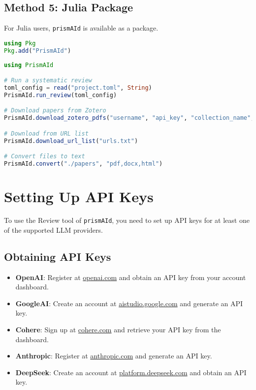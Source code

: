 \subsection{Method 5: Julia Package}

For Julia users, \texttt{prismAId} is available as a package.

\begin{commandbox}
\begin{lstlisting}[language=Julia]
using Pkg
Pkg.add("PrismAId")
\end{lstlisting}
\end{commandbox}

\begin{commandbox}
\begin{lstlisting}[language=Julia]
using PrismAId

# Run a systematic review
toml_config = read("project.toml", String)
PrismAId.run_review(toml_config)

# Download papers from Zotero
PrismAId.download_zotero_pdfs("username", "api_key", "collection_name", "./papers")

# Download from URL list
PrismAId.download_url_list("urls.txt")

# Convert files to text
PrismAId.convert("./papers", "pdf,docx,html")
\end{lstlisting}
\end{commandbox}

\section{Setting Up API Keys}

To use the Review tool of \texttt{prismAId}, you need to set up API keys for at least one of the supported LLM providers.

\subsection{Obtaining API Keys}

\begin{itemize}
    \item \textbf{OpenAI}: Register at \href{https://www.openai.com/}{openai.com} and obtain an API key from your account dashboard.
    \item \textbf{GoogleAI}: Create an account at \href{https://aistudio.google.com}{aistudio.google.com} and generate an API key.
    \item \textbf{Cohere}: Sign up at \href{https://cohere.com/}{cohere.com} and retrieve your API key from the dashboard.
    \item \textbf{Anthropic}: Register at \href{https://www.anthropic.com/}{anthropic.com} and generate an API key.
    \item \textbf{DeepSeek}: Create an account at \href{https://platform.deepseek.com/}{platform.deepseek.com} and obtain an API key.
\end{itemize}

